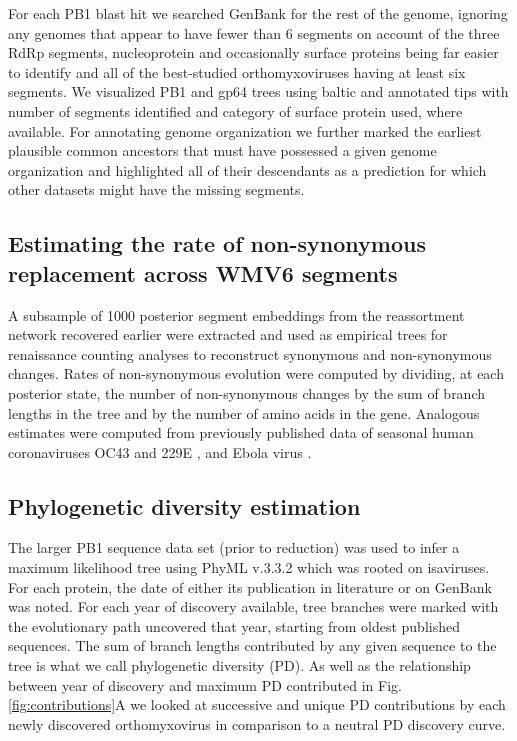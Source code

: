 \documentclass[11pt,twocolumn]{article}
\begin{document}
For each PB1 blast hit we searched GenBank for the rest of the genome, ignoring any genomes that appear to have fewer than 6 segments on account of the three RdRp segments, nucleoprotein and occasionally surface proteins being far easier to identify and all of the best-studied orthomyxoviruses having at least six segments.
We visualized PB1 and gp64 trees using baltic and annotated tips with number of segments identified and category of surface protein used, where available.
For annotating genome organization we further marked the earliest plausible common ancestors that must have possessed a given genome organization and highlighted all of their descendants as a prediction for which other datasets might have the missing segments.

\subsection{Estimating the rate of non-synonymous replacement across WMV6 segments}

A subsample of 1000 posterior segment embeddings from the reassortment network recovered earlier were extracted and used as empirical trees for renaissance counting analyses \citep{lemey_counting_2012} to reconstruct synonymous and non-synonymous changes.
Rates of non-synonymous evolution were computed by dividing, at each posterior state, the number of non-synonymous changes by the sum of branch lengths in the tree and by the number of amino acids in the gene.
Analogous estimates were computed from previously published data of seasonal human coronaviruses OC43 and 229E \citep{kistler_evidence_2021}, and Ebola virus \citep{park_ebola_2015}.


\subsection{Phylogenetic diversity estimation}

The larger PB1 sequence data set (prior to reduction) was used to infer a maximum likelihood tree using PhyML v.3.3.2 which was rooted on isaviruses.
For each protein, the date of either its publication in literature or on GenBank was noted.
For each year of discovery available, tree branches were marked with the evolutionary path uncovered that year, starting from oldest published sequences.
The sum of branch lengths contributed by any given sequence to the tree is what we call phylogenetic diversity (PD).
As well as the relationship between year of discovery and maximum PD contributed in Fig. \ref{fig:contributions}A we looked at successive and unique PD contributions by each newly discovered orthomyxovirus in comparison to a neutral PD discovery curve.
\end{document}
